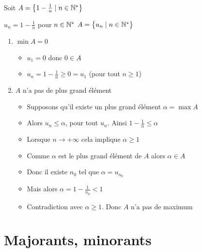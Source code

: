 \begin{frame}
\begin{exemple}
Soit $A=\big\{ 1-\frac{1}{n} \mid n\in \mathbb{N}^* \big\}$

\pause

 \qquad $u_n=1-\frac{1}{n}$ pour $n\in \mathbb{N}^* $ \qquad $A=\big\{ u_n \mid n\in \mathbb{N}^* \big\}$
\pause
\vspace*{-1ex}
\vspace*{-4ex}
\pause
\begin{enumerate}
  \item $\min A=0$
\pause
  \begin{itemize}
    \item $u_1=0$ donc $0 \in A$
\pause
    \item $u_n =1-\frac{1}{n}\ge 0=u_1$ (pour tout $n\ge 1$)
  \end{itemize}
\pause
  \item $A$ n'a pas de plus grand élément
  \begin{itemize}
\pause
    \item Supposons qu'il existe un plus grand élément $\alpha=\max A$
\pause
    \item Alors $u_n \le \alpha$, pour tout $u_n$. Ainsi $1-\frac{1}{n} \le \alpha$
\pause
    \item Lorsque $n \to +\infty$ cela implique $\alpha \ge 1$
\pause
    \item Comme $\alpha$ est le plus grand élément de $A$ alors $\alpha \in A$
\pause
    \item Donc il existe $n_0$ tel que $\alpha = u_{n_0}$
\pause
    \item Mais alors $\alpha = 1-\frac{1}{n_0} <1$
\pause
    \item Contradiction avec $\alpha \ge 1$. Donc $A$ n'a pas de maximum
  \end{itemize}
\end{enumerate}
\end{exemple}

\end{frame}


\section*{Majorants, minorants}


